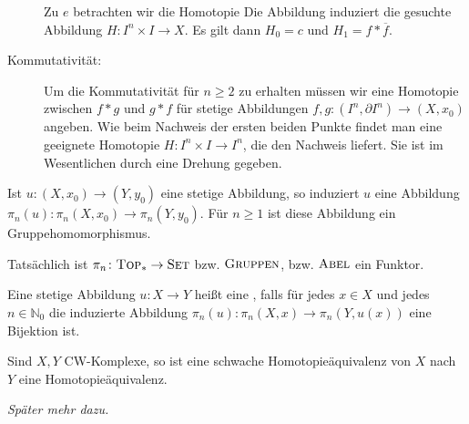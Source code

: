 \begin{beweis}
\begin{description}
		
		Zu $e$ betrachten wir die Homotopie 
		Die Abbildung
		induziert die gesuchte Abbildung $H \colon I^n \times I \to X$.
		Es gilt dann $H_0=c$ und $H_1 = f * \overline{f}$.
		\item[Kommutativität:] Um die Kommutativität für $n \ge 2$ zu erhalten müssen wir eine Homotopie zwischen $f * g $ und $g * f$ für stetige Abbildungen $f,g \colon (I^n,\partial I^n) \to (X,x_0)$ angeben.
		Wie beim Nachweis der ersten beiden Punkte findet man eine geeignete Homotopie $H \colon I^n \times I \to I^n$, die den Nachweis liefert.
		Sie ist im Wesentlichen durch eine Drehung gegeben.\qedhere
	\end{description}
\end{beweis}

\begin{proposition}[{name=[induzierte Abbildungen]}]
	Ist $u \colon (X,x_0) \to (Y,y_0)$ eine stetige Abbildung, so induziert $u$ eine Abbildung $\pi_n(u) \colon \pi_n(X,x_0) \to \pi_n(Y,y_0)$.
	Für $n \ge 1$ ist diese Abbildung ein Gruppehomomorphismus.
	
	Tatsächlich ist $\pi_n \colon \textsc{Top}_* \to \textsc{Set}$ bzw. $\textsc{Gruppen}$, bzw. $\textsc{Abel}$ ein Funktor.
\end{proposition}

\begin{definition}[{name=[schwache Homotopieäquivalenz]}]
	Eine stetige Abbildung $u \colon X \to Y$ heißt eine , falls für jedes $x \in X$ und jedes $n \in \mathbb{N}_0$ die induzierte Abbildung $\pi_n(u) \colon \pi_n(X,x) \to \pi_n(Y,u(x))$ eine Bijektion ist.
\end{definition}

\begin{satz}[name={Whitehead}]
	Sind $X,Y$ CW-Komplexe, so ist eine schwache Homotopieäquivalenz von $X$ nach $Y$ eine Homotopieäquivalenz.
\end{satz}
\begin{beweis}
	\emph{Später mehr dazu.}
\end{beweis}

